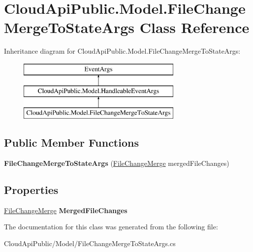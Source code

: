 \hypertarget{class_cloud_api_public_1_1_model_1_1_file_change_merge_to_state_args}{\section{Cloud\-Api\-Public.\-Model.\-File\-Change\-Merge\-To\-State\-Args Class Reference}
\label{class_cloud_api_public_1_1_model_1_1_file_change_merge_to_state_args}
}
Inheritance diagram for Cloud\-Api\-Public.\-Model.\-File\-Change\-Merge\-To\-State\-Args\-:\begin{figure}[H]
\begin{center}
\leavevmode
\includegraphics[height=3.000000cm]{class_cloud_api_public_1_1_model_1_1_file_change_merge_to_state_args}
\end{center}
\end{figure}
\subsection*{Public Member Functions}
\begin{DoxyCompactItemize}
\item 
\hypertarget{class_cloud_api_public_1_1_model_1_1_file_change_merge_to_state_args_a52ea2d1ee6bdde24fb5d9e79e45c7e0e}{{\bfseries File\-Change\-Merge\-To\-State\-Args} (\hyperlink{struct_cloud_api_public_1_1_model_1_1_file_change_merge}{File\-Change\-Merge} merged\-File\-Changes)}\label{class_cloud_api_public_1_1_model_1_1_file_change_merge_to_state_args_a52ea2d1ee6bdde24fb5d9e79e45c7e0e}

\end{DoxyCompactItemize}
\subsection*{Properties}
\begin{DoxyCompactItemize}
\item 
\hypertarget{class_cloud_api_public_1_1_model_1_1_file_change_merge_to_state_args_a63d0a00cc4825d96dffa4878d9b4466b}{\hyperlink{struct_cloud_api_public_1_1_model_1_1_file_change_merge}{File\-Change\-Merge} {\bfseries Merged\-File\-Changes}}\label{class_cloud_api_public_1_1_model_1_1_file_change_merge_to_state_args_a63d0a00cc4825d96dffa4878d9b4466b}

\end{DoxyCompactItemize}


The documentation for this class was generated from the following file\-:\begin{DoxyCompactItemize}
\item 
Cloud\-Api\-Public/\-Model/File\-Change\-Merge\-To\-State\-Args.\-cs\end{DoxyCompactItemize}
